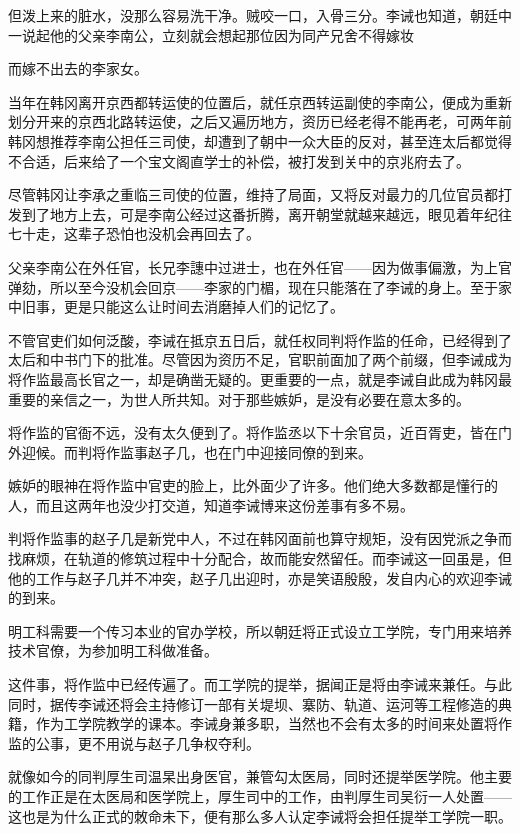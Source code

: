 但泼上来的脏水，没那么容易洗干净。贼咬一口，入骨三分。李诫也知道，朝廷中一说起他的父亲李南公，立刻就会想起那位因为同产兄舍不得嫁妆

而嫁不出去的李家女。

当年在韩冈离开京西都转运使的位置后，就任京西转运副使的李南公，便成为重新划分开来的京西北路转运使，之后又遍历地方，资历已经老得不能再老，可两年前韩冈想推荐李南公担任三司使，却遭到了朝中一众大臣的反对，甚至连太后都觉得不合适，后来给了一个宝文阁直学士的补偿，被打发到关中的京兆府去了。

尽管韩冈让李承之重临三司使的位置，维持了局面，又将反对最力的几位官员都打发到了地方上去，可是李南公经过这番折腾，离开朝堂就越来越远，眼见着年纪往七十走，这辈子恐怕也没机会再回去了。

父亲李南公在外任官，长兄李譓中过进士，也在外任官——因为做事偏激，为上官弹劾，所以至今没机会回京——李家的门楣，现在只能落在了李诫的身上。至于家中旧事，更是只能这么让时间去消磨掉人们的记忆了。

不管官吏们如何泛酸，李诫在抵京五日后，就任权同判将作监的任命，已经得到了太后和中书门下的批准。尽管因为资历不足，官职前面加了两个前缀，但李诫成为将作监最高长官之一，却是确凿无疑的。更重要的一点，就是李诫自此成为韩冈最重要的亲信之一，为世人所共知。对于那些嫉妒，是没有必要在意太多的。

将作监的官衙不远，没有太久便到了。将作监丞以下十余官员，近百胥吏，皆在门外迎候。而判将作监事赵子几，也在门中迎接同僚的到来。

嫉妒的眼神在将作监中官吏的脸上，比外面少了许多。他们绝大多数都是懂行的人，而且这两年也没少打交道，知道李诫博来这份差事有多不易。

判将作监事的赵子几是新党中人，不过在韩冈面前也算守规矩，没有因党派之争而找麻烦，在轨道的修筑过程中十分配合，故而能安然留任。而李诫这一回虽是，但他的工作与赵子几并不冲突，赵子几出迎时，亦是笑语殷殷，发自内心的欢迎李诫的到来。

明工科需要一个传习本业的官办学校，所以朝廷将正式设立工学院，专门用来培养技术官僚，为参加明工科做准备。

这件事，将作监中已经传遍了。而工学院的提举，据闻正是将由李诫来兼任。与此同时，据传李诫还将会主持修订一部有关堤坝、寨防、轨道、运河等工程修造的典籍，作为工学院教学的课本。李诫身兼多职，当然也不会有太多的时间来处置将作监的公事，更不用说与赵子几争权夺利。

就像如今的同判厚生司温杲出身医官，兼管勾太医局，同时还提举医学院。他主要的工作正是在太医局和医学院上，厚生司中的工作，由判厚生司吴衍一人处置——这也是为什么正式的敇命未下，便有那么多人认定李诫将会担任提举工学院一职。

